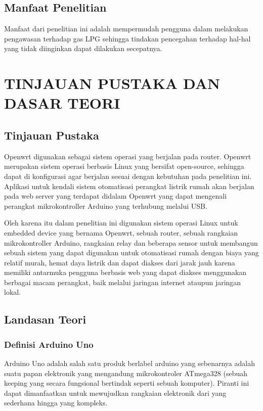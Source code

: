 \documentclass{jtetiproposalskripsi}
\begin{document}
\section{Manfaat Penelitian}
Manfaat dari penelitian ini adalah mempermudah pengguna dalam melakukan pengawasan terhadap gas LPG sehingga tindakan pencegahan terhadap hal-hal yang tidak diinginkan dapat dilakukan secepatnya.
 

\chapter{TINJAUAN PUSTAKA DAN DASAR TEORI}                

\section{Tinjauan Pustaka}
Openwrt digunakan sebagai sistem operasi yang berjalan pada router. Openwrt merupakan sistem operasi berbasis Linux yang bersifat open-source, sehingga dapat di konfigurasi agar berjalan sesuai dengan kebutuhan pada penelitian ini. Aplikasi untuk kendali sistem otomatisasi perangkat listrik rumah akan berjalan pada web server yang terdapat didalam Openwrt yang dapat mengenali perangkat mikrokontroller Arduino yang terhubung melalui USB.

Oleh karena itu dalam penelitian ini digunakan sistem operasi Linux untuk embedded device yang bernama Openwrt, sebuah router, sebuah rangkaian mikrokontroller Arduino, rangkaian relay dan beberapa sensor untuk membangun sebuah sistem yang dapat digunakan untuk otomatisasi rumah dengan biaya yang relatif murah, hemat daya listrik dan dapat diakses dari jarak jauh karena memiliki antarmuka pengguna berbasis web yang dapat diakses menggunakan berbagai macam perangkat, baik melalui jaringan internet ataupun jaringan lokal.


\section{Landasan Teori}
\subsection{Definisi Arduino Uno }
Arduino Uno adalah salah satu produk berlabel arduino yang sebenarnya adalah suatu papan elektronik yang mengandung mikrokontroler ATmega328 (sebuah keeping yang secara fungsional bertindak seperti sebuah komputer). Piranti ini dapat dimanfaatkan untuk mewujudkan rangkaian elektronik dari yang sederhana hingga yang kompleks.
\end{document}
